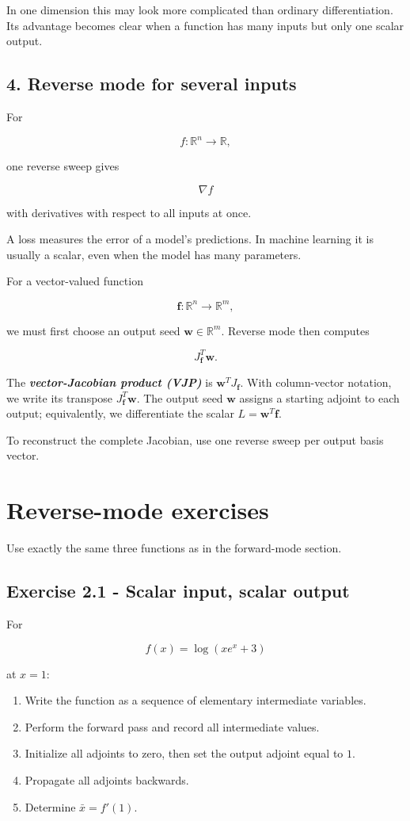 \documentclass[10pt]{article}
\begin{document}
In one dimension this may look more complicated than ordinary differentiation. Its advantage becomes clear when a function has many inputs but only one scalar output.

\subsection*{4. Reverse mode for several inputs}
For

\[
f:\mathbb R^n\to\mathbb R,
\]

one reverse sweep gives

\[
\nabla f
\]

with derivatives with respect to all inputs at once.

A loss measures the error of a model's predictions. In machine learning it is usually a scalar, even when the model has many parameters.

For a vector-valued function

\[
\mathbf f:\mathbb R^n\to\mathbb R^m,
\]

we must first choose an output seed $\mathbf w\in\mathbb R^m$. Reverse mode then computes

\[
{
J_{\mathbf f}^T\mathbf w
}.
\]

The \textbf{\textit{vector-Jacobian product (VJP)}} is $\mathbf w^TJ_{\mathbf f}$. With column-vector notation, we write its transpose $J_{\mathbf f}^T\mathbf w$. The output seed $\mathbf w$ assigns a starting adjoint to each output; equivalently, we differentiate the scalar $L=\mathbf w^T\mathbf f$.

To reconstruct the complete Jacobian, use one reverse sweep per output basis vector.

\section*{Reverse-mode exercises}
Use exactly the same three functions as in the forward-mode section.

\subsection*{Exercise 2.1 - Scalar input, scalar output}
For

\[
f(x)=\log(xe^x+3)
\]

at $x=1$:

\begin{enumerate}
\item
Write the function as a sequence of elementary intermediate variables.

\item
Perform the forward pass and record all intermediate values.

\item
Initialize all adjoints to zero, then set the output adjoint equal to $1$.

\item
Propagate all adjoints backwards.

\item
Determine $\bar x=f'(1)$.

\end{enumerate}
\end{document}
